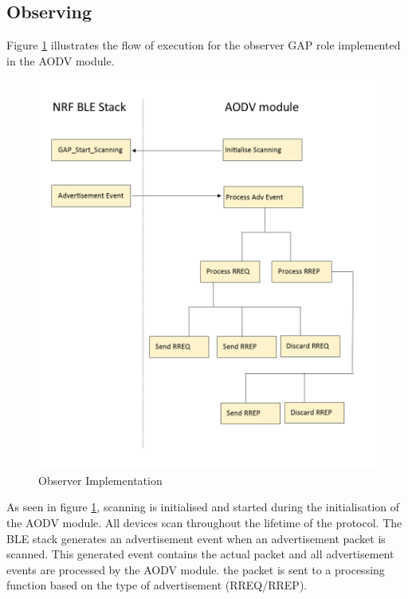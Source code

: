       \subsection{Observing}
    Figure \ref{fig:observer} illustrates the flow of execution for the observer
    GAP role implemented in the AODV module.

    \FloatBarrier
    \begin{figure}[ht]
      \includegraphics[width=\textwidth]{Images/chapter4/observer_flow.png}
      \caption{Observer Implementation}
      \label{fig:observer}
    \end{figure}
    \FloatBarrier

    As seen in figure \ref{fig:observer}, scanning is initialised and started during
    the initialisation of the AODV module. All devices scan throughout the
    lifetime of the protocol. The BLE stack generates an advertisement event
    when an advertisement packet is scanned. This generated event contains the
    actual packet and all advertisement events are processed by the AODV module.
    the packet is sent to a processing function based on the type of advertisement
    (RREQ/RREP).

